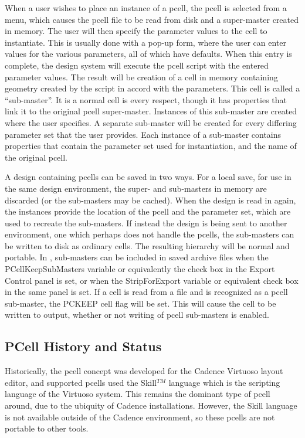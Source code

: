 When a user wishes to place an instance of a pcell, the pcell is
selected from a menu, which causes the pcell file to be read from disk
and a super-master created in memory.  The user will then specify the
parameter values to the cell to instantiate.  This is usually done
with a pop-up form, where the user can enter values for the various
parameters, all of which have defaults.  When this entry is complete,
the design system will execute the pcell script with the entered
parameter values.  The result will be creation of a cell in memory
containing geometry created by the script in accord with the
parameters.  This cell is called a ``sub-master''.  It is a normal
cell is every respect, though it has properties that link it to the
original pcell super-master.  Instances of this sub-master are created
where the user specifies.  A separate sub-master will be created for
every differing parameter set that the user provides.  Each instance
of a sub-master contains properties that contain the parameter set
used for instantiation, and the name of the original pcell.

A design containing pcells can be saved in two ways.  For a local
save, for use in the same design environment, the super- and
sub-masters in memory are discarded (or the sub-masters may be
cached).  When the design is read in again, the instances provide the
location of the pcell and the parameter set, which are used to
recreate the sub-masters.  If instead the design is being sent to
another environment, one which perhaps does not handle the pcells, the
sub-masters can be written to disk as ordinary cells.  The resulting
hierarchy will be normal and portable.  In {\Xic}, sub-masters can be
included in saved archive files when the {\cb PCellKeepSubMasters}
variable or equivalently the check box in the {\cb Export Control}
panel is set, or when the {\et StripForExport} variable or equivalent
check box in the same panel is set.  If a cell is read from a file and
is recognized as a pcell sub-master, the PCKEEP cell flag will be set. 
This will cause the cell to be written to output, whether or not
writing of pcell sub-masters is enabled.

\subsection{PCell History and Status}

Historically, the pcell concept was developed for the Cadence Virtuoso
layout editor, and supported pcells used the Skill$^{TM}$ language
which is the scripting language of the Virtuoso system.  This remains
the dominant type of pcell around, due to the ubiquity of Cadence
installations.  However, the Skill language is not available outside
of the Cadence environment, so these pcells are not portable to other
tools.

